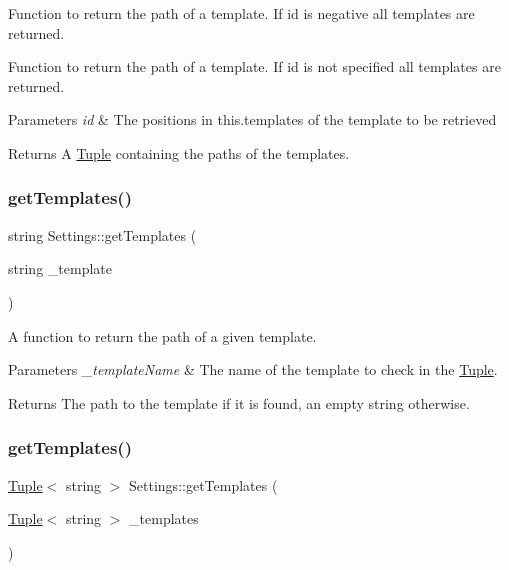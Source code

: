 Function to return the path of a template. If id is negative all templates are returned. 

Function to return the path of a template. If id is not specified all templates are returned.


\begin{DoxyParams}{Parameters}
{\em id} & The positions in this.\+templates of the template to be retrieved \\
\hline
\end{DoxyParams}
\begin{DoxyReturn}{Returns}
A \mbox{\hyperlink{class_tuple}{Tuple}} containing the paths of the templates. 
\end{DoxyReturn}
\mbox{\label{class_settings_aa77f9d559fb0f14d551c4ee8a742e6b0}} 
\subsubsection{\texorpdfstring{getTemplates()}{getTemplates()}\hspace{0.1cm}{\footnotesize\ttfamily [2/3]}}
{\footnotesize\ttfamily string Settings\+::get\+Templates (\begin{DoxyParamCaption}\item[{string}]{\+\_\+template }\end{DoxyParamCaption})}



A function to return the path of a given template. 


\begin{DoxyParams}{Parameters}
{\em \+\_\+template\+Name} & The name of the template to check in the \mbox{\hyperlink{class_tuple}{Tuple}}. \\
\hline
\end{DoxyParams}
\begin{DoxyReturn}{Returns}
The path to the template if it is found, an empty string otherwise. 
\end{DoxyReturn}
\mbox{\label{class_settings_a2fe58de6135c30ec02bccfc20cc15fe3}} 
\subsubsection{\texorpdfstring{getTemplates()}{getTemplates()}\hspace{0.1cm}{\footnotesize\ttfamily [3/3]}}
{\footnotesize\ttfamily \mbox{\hyperlink{class_tuple}{Tuple}}$<$ string $>$ Settings\+::get\+Templates (\begin{DoxyParamCaption}\item[{\mbox{\hyperlink{class_tuple}{Tuple}}$<$ string $>$}]{\+\_\+templates }\end{DoxyParamCaption})}



